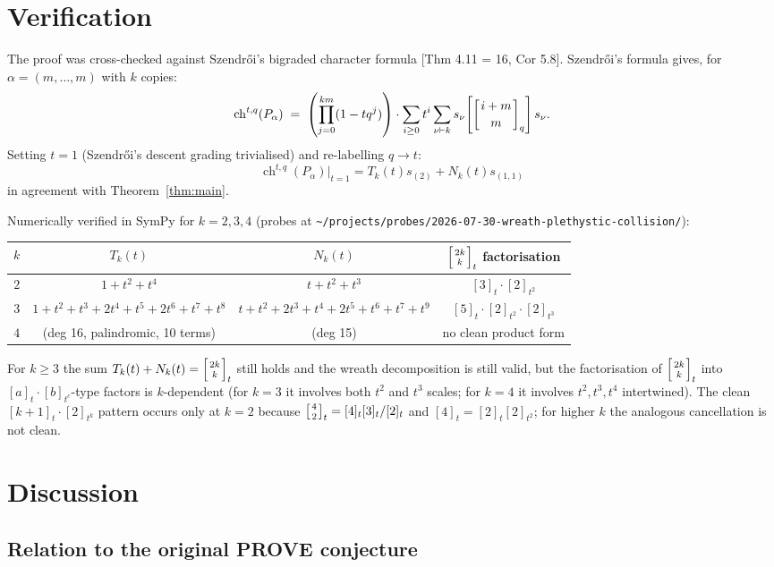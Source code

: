 \documentclass[11pt]{article}
\theoremstyle{remark}
\newcommand{\ch}{\operatorname{ch}}
\newcommand{\qbinom}[2]{\left[{#1 \atop #2}\right]}
\begin{document}
\section{Verification}

The proof was cross-checked against Szendr\H oi's bigraded character formula
[Thm 4.11 = 16, Cor 5.8]. Szendr\H oi's formula gives, for $\alpha = (m,\ldots,m)$
with $k$ copies:
\[
\ch^{t,q}(P_\alpha)
\;=\; \left(\prod_{j=0}^{km}(1-tq^j)\right)
   \cdot \sum_{i \geq 0} t^i \sum_{\nu \vdash k} s_\nu\!\left[\left[{i+m \atop m}\right]_q\right] s_\nu.
\]
Setting $t = 1$ (Szendr\H oi's descent grading trivialised) and re-labelling
$q \to t$:
\[
\ch^{t,q}(P_\alpha)\Big|_{t=1} = T_k(t) s_{(2)} + N_k(t) s_{(1,1)}
\]
in agreement with Theorem~\ref{thm:main}.

Numerically verified in SymPy for $k = 2, 3, 4$
(probes at \verb|~/projects/probes/2026-07-30-wreath-plethystic-collision/|):

\smallskip
\noindent\begin{tabular}{c|ccc}
$k$ & $T_k(t)$ & $N_k(t)$ & $\qbinom{2k}{k}_t$ factorisation \\
\hline
$2$ & $1 + t^2 + t^4$ & $t + t^2 + t^3$ & $[3]_t \cdot [2]_{t^2}$ \\
$3$ & $1 + t^2 + t^3 + 2t^4 + t^5 + 2t^6 + t^7 + t^8$
    & $t + t^2 + 2t^3 + t^4 + 2t^5 + t^6 + t^7 + t^9$
    & $[5]_t \cdot [2]_{t^2} \cdot [2]_{t^3}$ \\
$4$ & (deg 16, palindromic, 10 terms) & (deg 15) & no clean product form \\
\end{tabular}

\smallskip
For $k \geq 3$ the sum $T_k(t) + N_k(t) = \qbinom{2k}{k}_t$ still holds and
the wreath decomposition is still valid, but the factorisation of
$\qbinom{2k}{k}_t$ into $[a]_t \cdot [b]_{t^c}$-type factors is
$k$-dependent (for $k=3$ it involves both $t^2$ and $t^3$ scales; for
$k=4$ it involves $t^2, t^3, t^4$ intertwined). The clean
$[k{+}1]_t \cdot [2]_{t^k}$ pattern occurs only at $k = 2$ because
$\qbinom{4}{2}_t = [4]_t [3]_t / [2]_t$ and $[4]_t = [2]_t [2]_{t^2}$;
for higher $k$ the analogous cancellation is not clean.

\section{Discussion}

\subsection{Relation to the original PROVE conjecture}
\end{document}
